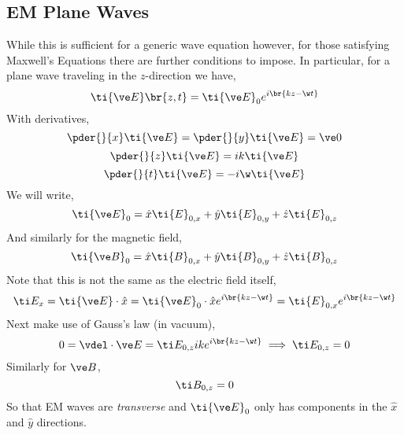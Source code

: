 \documentclass{article}
\begin{document}
\subsection{EM Plane Waves}
While this is sufficient for a generic wave equation however, for those satisfying Maxwell's Equations there are further conditions to impose. In particular, for a plane wave traveling in the $z$-direction we have,
\[ \ti {\ve E} \br{z, t} = \ti{\ve E}_0 e^{i\br{k z - \w t}} \]
With derivatives,
\[ \pder{}{x} \ti {\ve E} = \pder{}{y} \ti {\ve E} = \ve 0 \]
\[ \pder{}{z} \ti {\ve E} = ik \ti {\ve E} \]
\[ \pder{}{t} \ti {\ve E} = -i\w \ti {\ve E} \]
We will write,
\[ \ti{{\ve E}}_0 = \hat x \ti {E}_{0, x} + \hat y \ti {E}_{0, y} + \hat z \ti {E}_{0, z} \]
And similarly for the magnetic field,
\[ \ti {\ve B}_0 = \hat x \ti {B}_{0, x} + \hat y \ti {B}_{0, y} + \hat z \ti {B}_{0, z} \]
Note that this is not the same as the electric field itself,
\[ \ti E_x = \ti{\ve E} \cdot \hat x = \ti{\ve E}_0 \cdot \hat x e^{i \br{kz - \w t}} = \ti{E}_{0,x} e^{i \br{kz - \w t}} \]
Next make use of Gauss's law (in vacuum),
\[ 0 = \vdel \cdot \ve E = \ti E_{0,z} i k e^{i\br{kz - \w t}} \implies \ti E_{0,z} = 0 \]
Similarly for $\ve B$,
\[ \ti B_{0,z} = 0 \]
So that EM waves are \textit{transverse} and $\ti {\ve E}_0$ only has components in the $\hat x$ and $\hat y$ directions.\\
\end{document}

